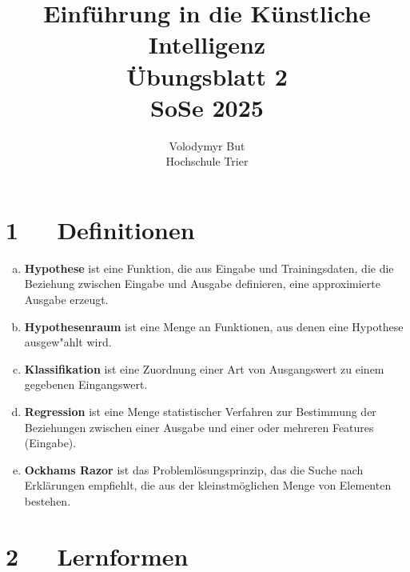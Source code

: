 \documentclass[10pt, oneside]{article}
\title{Einführung in die Künstliche Intelligenz\\[15pt]\Large{Übungsblatt 2}\\[10pt]\Large{SoSe 2025}}
\author{Volodymyr But\\[10pt]Hochschule Trier}
\date{}
\begin{document}
\maketitle
\vspace{25px}

\section{1\ \ \ Definitionen}

\begin{enumerate}[(a)]
    \item \textbf{Hypothese} ist eine Funktion, die aus Eingabe und
        Trainingsdaten, die die Beziehung zwischen Eingabe und Ausgabe
        definieren, eine approximierte Ausgabe erzeugt.

    \item \textbf{Hypothesenraum} ist eine Menge an Funktionen, aus denen eine
        Hypothese ausgew"ahlt wird.

    \item \textbf{Klassifikation} ist eine Zuordnung einer Art von Ausgangswert
        zu einem gegebenen Eingangswert.

    \item \textbf{Regression} ist eine Menge statistischer Verfahren zur
        Bestimmung der Beziehungen zwischen einer Ausgabe und einer oder
        mehreren Features (Eingabe).

    \item \textbf{Ockhams Razor} ist das Problemlösungsprinzip, das die Suche
        nach Erklärungen empfiehlt, die aus der kleinstmöglichen Menge von
        Elementen bestehen.
\end{enumerate}

\section{2\ \ \ Lernformen}
\end{document}
